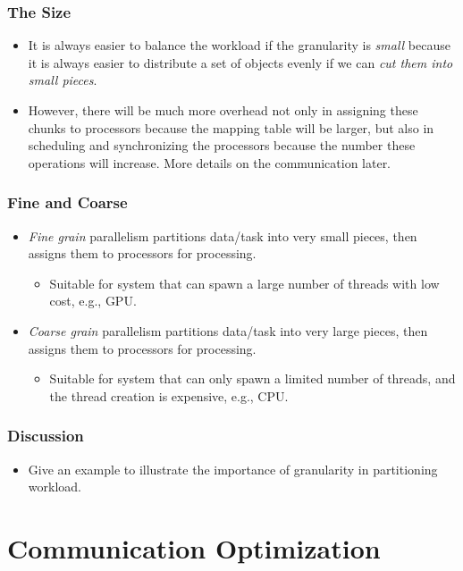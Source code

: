 \documentclass{beamer}
\begin{document}
\begin{CJK}{UTF8}{bsmi}
\begin{frame}
\frametitle{The Size}
\begin{itemize}
\item It is always easier to balance the workload if the granularity
  is {\em small} because it is always easier to distribute a set of
  objects evenly if we can {\em cut them into small pieces}.
\item However, there will be much more overhead not only in assigning
  these chunks to processors because the mapping table will be larger,
  but also in scheduling and synchronizing the processors because the
  number these operations will increase.  More details on the
  communication later.
\end{itemize}
\end{frame}

\begin{frame}
\frametitle{Fine and Coarse}
\begin{itemize}
\item {\em Fine grain} parallelism partitions data/task into very
  small pieces, then assigns them to processors for processing.
\begin{itemize}
\item Suitable for system that can spawn a large number of threads
  with low cost, e.g., GPU.
\end{itemize}
\item {\em Coarse grain} parallelism partitions data/task into very
  large pieces, then assigns them to processors for processing.
\begin{itemize}
\item Suitable for system that can only spawn a limited number of
  threads, and the thread creation is expensive, e.g., CPU.
\end{itemize}
\end{itemize}
\end{frame}

\begin{frame}
\frametitle{Discussion}
\begin{itemize}
\item Give an example to illustrate the importance of granularity in
  partitioning workload.
\end{itemize}
\end{frame}

\section{Communication Optimization}


\end{CJK}
\end{document}
